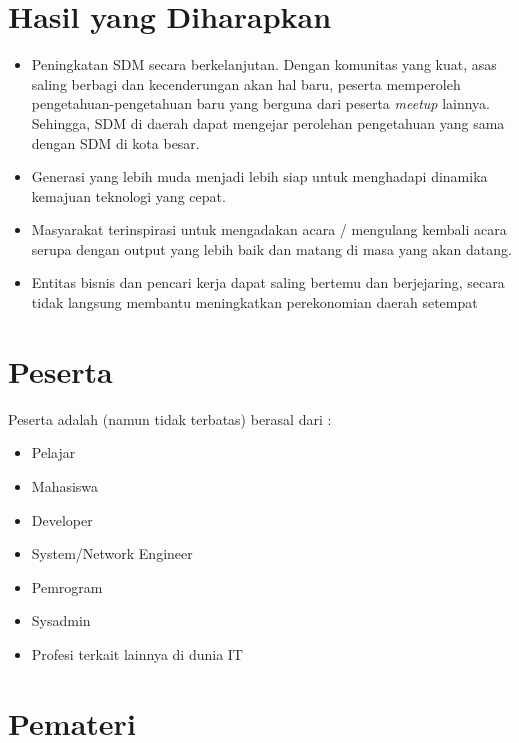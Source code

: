 \documentclass{article}
\begin{document}
\section{Hasil yang Diharapkan}
\begin{itemize}
  \item Peningkatan SDM secara berkelanjutan. Dengan komunitas yang kuat, asas saling berbagi dan kecenderungan akan hal baru, peserta memperoleh pengetahuan-pengetahuan baru yang berguna dari peserta \textit{meetup} lainnya. Sehingga, SDM di daerah dapat mengejar perolehan pengetahuan yang sama dengan SDM di kota besar.
  \item Generasi yang lebih muda menjadi lebih siap untuk menghadapi dinamika kemajuan teknologi yang cepat. 
  \item Masyarakat terinspirasi untuk mengadakan acara / mengulang kembali acara serupa dengan output yang lebih baik dan matang di masa yang akan datang.
  \item Entitas bisnis dan pencari kerja dapat saling bertemu dan berjejaring, secara tidak langsung membantu meningkatkan perekonomian daerah setempat
\end{itemize}

\section{Peserta}

Peserta adalah (namun tidak terbatas) berasal dari :

\begin{itemize}
  \item Pelajar
  \item Mahasiswa
  \item Developer
  \item System/Network Engineer
  \item Pemrogram
  \item Sysadmin
  \item Profesi terkait lainnya di dunia IT
\end{itemize}

\section{Pemateri}
\end{document}
